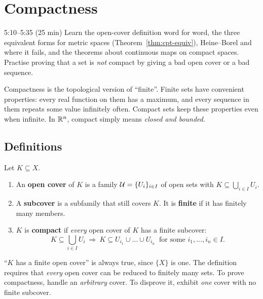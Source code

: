 \chapter{Compactness}\label{ch:5}
\begin{studyslot}{5:10--5:35 (25 min)}
Learn the open-cover definition word for word, the three equivalent forms for metric spaces (Theorem~\ref{thm:cpt-equiv}), Heine--Borel and where it fails, and the theorems about continuous maps on compact spaces. Practise proving that a set is \emph{not} compact by giving a bad open cover or a bad sequence.
\end{studyslot}

\begin{intuition}
Compactness is the topological version of ``finite''. Finite sets have convenient properties: every real function on them has a maximum, and every sequence in them repeats some value infinitely often. Compact sets keep these properties even when infinite. In $\mathbb{R}^n$, compact simply means \emph{closed and bounded}.
\end{intuition}

\section{Definitions}
\begin{definition}\label{def:compact}
Let $K\subseteq X$.
\begin{enumerate}[label=(\roman*)]
  \item An \textbf{open cover} of $K$ is a family $\mathcal{U}=\{U_i\}_{i\in I}$ of open sets with $K\subseteq\bigcup_{i\in I}U_i$.
  \item A \textbf{subcover} is a subfamily that still covers $K$. It is \textbf{finite} if it has finitely many members.
  \item $K$ is \textbf{compact} if \emph{every} open cover of $K$ has a finite subcover:
  \[
    K\subseteq\bigcup_{i\in I}U_i\ \Longrightarrow\ K\subseteq U_{i_1}\cup\dots\cup U_{i_n}\ \text{ for some } i_1,\dots,i_n\in I .
  \]
\end{enumerate}
\end{definition}

\begin{warning}
``$K$ has a finite open cover'' is always true, since $\{X\}$ is one. The definition requires that \emph{every} open cover can be reduced to finitely many sets. To prove compactness, handle an \emph{arbitrary} cover. To disprove it, exhibit \emph{one} cover with no finite subcover.
\end{warning}

